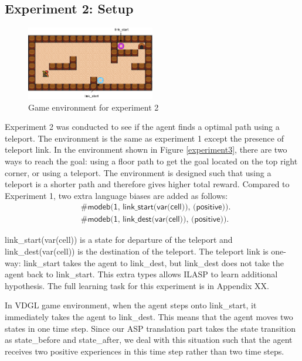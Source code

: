\subsection{Experiment 2: Setup}
\label{subsec:experiement2_setup}
\begin{figure}[!htb]
\centering
\includegraphics[width=0.5\textwidth]{./figures/experiment2_setup}
\caption{Game environment for experiment 2}
\label{experiment2}
\end{figure}
Experiment 2 was conducted to see if the agent finds a optimal path using a teleport. The environment is the same as experiment 1 except the presence of teleport link.
In the environment shown in Figure \ref{experiment3},
there are two ways to reach the goal: using a floor path to get the goal located on the top right corner, or using a teleport.
The environment is designed such that using a teleport is a shorter path and therefore gives higher total reward.
Compared to Experiment 1, two extra language biases are added as follows:
\begin{equation*}
\begin{split}
&\textsf{\#modeb(1, link\_start(var(cell)), (positive)).}\\
&\textsf{\#modeb(1, link\_dest(var(cell)), (positive)).}
\end{split}
\end{equation*}

\textsf{link\_start(var(cell))} is a state for departure of the teleport and \textsf{link\_dest(var(cell))} is the destination of the teleport. 
The teleport link is one-way: \textsf{link\_start} takes the agent to \textsf{link\_dest}, but \textsf{link\_dest} does not take the agent back to \textsf{link\_start}.
This extra types allows ILASP to learn additional hypothesis.
The full learning task for this experiment is in Appendix XX.

In VDGL game environment, when the agent steps onto \textsf{link\_start}, it immediately takes the agent to \textsf{link\_dest}. This means that the agent moves two states in one time step.
Since our ASP translation part takes the state transition as \textsf{state\_before} and \textsf{state\_after}, 
we deal with this situation such that the agent receives two positive experiences in this time step rather than two time steps.

